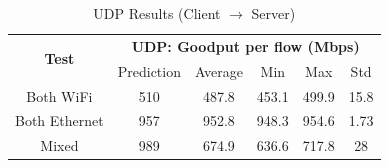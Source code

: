         \begin{table}[H]
            \small
            \centering
            \begin{tabular}{|ll|lllll|}
            \hline
            \multicolumn{2}{|c|}{\multirow{2}{*}{\textbf{Test}}} & 
                \multicolumn{5}{c|}{\textbf{UDP: Goodput per flow (Mbps)}} \\
            \cline{3-7}
            \multicolumn{2}{|c|}{} &
                \multicolumn{1}{c|}{Prediction} &
                \multicolumn{1}{c|}{Average} &
                \multicolumn{1}{c|}{Min} &
                \multicolumn{1}{c|}{Max} &
                \multicolumn{1}{c|}{Std} \\
            \hline
            \multicolumn{2}{|c|}{Both WiFi} &
                \multicolumn{1}{c|}{510} &
                \multicolumn{1}{c|}{487.8} &
                \multicolumn{1}{c|}{453.1} &
                \multicolumn{1}{c|}{499.9} &
                \multicolumn{1}{c|}{15.8} \\
            \hline
            \multicolumn{2}{|c|}{Both Ethernet} &
                \multicolumn{1}{c|}{957} &
                \multicolumn{1}{c|}{952.8} &
                \multicolumn{1}{c|}{948.3} &
                \multicolumn{1}{c|}{954.6} &
                \multicolumn{1}{c|}{1.73} \\
            \hline
            \multicolumn{2}{|c|}{Mixed} &
                \multicolumn{1}{c|}{989} &
                \multicolumn{1}{c|}{674.9} &
                \multicolumn{1}{c|}{636.6} &
                \multicolumn{1}{c|}{717.8} &
                \multicolumn{1}{c|}{28} \\
            \hline
            \end{tabular}
            \vspace{0.5cm}
            \caption{UDP Results (Client $\rightarrow$ Server)}
            \label{tab:udp-results}
        \end{table}

